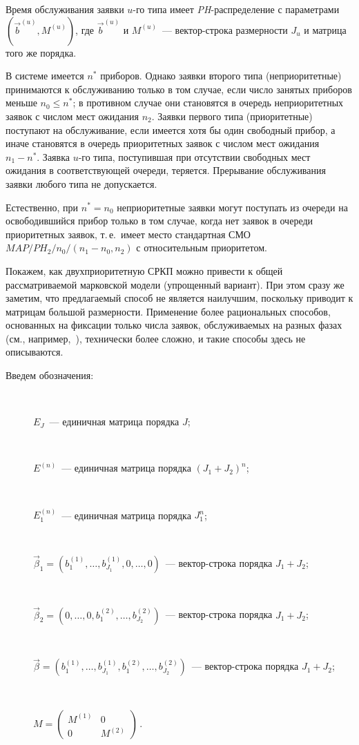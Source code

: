 \begin{multicols}{2}
Время обслуживания заявки $u$-го типа имеет {\it PH}-рас\-пре\-де\-ле\-ние
с параметрами $(\vec b^{(u)},M^{(u)})$, где $\vec b^{(u)}$ и
$M^{(u)}$~--- век\-тор-стро\-ка размерности $J_u$ и мат\-ри\-ца того же порядка.

В системе имеется $n^*$ приборов. Однако заявки второго типа (неприоритетные) принимаются к
обслуживанию только в том случае, если число занятых приборов меньше $n_0\le n^*$;
в противном случае они становятся в очередь неприоритетных заявок с числом мест ожидания $n_2$.
Заявки первого типа (приоритетные) поступают на обслуживание, если имеется
хотя бы один свободный прибор, а иначе становятся в очередь
приоритетных заявок с числом мест ожидания $n_1-n^*$.
Заявка $u$-го типа, поступившая при отсутствии свободных мест
ожидания в соответствующей очереди, теряется.
Прерывание обслуживания заявки любого типа не допускается.

Естественно, при $n^*=n_0$ неприоритетные заявки могут
поступать из очереди на освободившийся прибор только в том
случае, когда нет заявок в очереди приоритетных заявок, т.\,е.\
имеет место стандартная СМО $MAP/PH_2/n_0/(n_1-n_0,n_2)$ с
относительным приоритетом.

Покажем, как двухприоритетную СРКП можно привести к общей
рассматриваемой марковской модели (упрощенный вариант).
При этом сразу же заметим, что предлагаемый способ не
является наилучшим, поскольку приводит к матрицам большой
размерности.
Применение более рациональных способов, основанных на
фиксации только числа заявок, обслуживаемых на разных
фазах (см., например,~\cite{16-p}), технически более сложно, и
такие способы здесь не описываются.

\pagebreak

Введем обозначения:
\begin{description}
\item[\,] $E_J$~--- единичная матрица порядка $J$;
\item[\,] 
$E^{(n)}$~--- единичная матрица порядка $(J_1+J_2)^n$;
\item[\,] 
$E_1^{(n)}$~--- единичная матрица порядка $J_1^n$;
\item[\,] 
$\vec\beta_1 = (b^{(1)}_1,\ldots,b^{(1)}_{J_1},0,\ldots,0)$~---
век\-тор-стро\-ка порядка $J_1+J_2$;
\item[\,] 
$\vec\beta_2=(0,\ldots,0,b^{(2)}_1,\ldots,b^{(2)}_{J_2})$~---
вектор-строка порядка $J_1+J_2$;
\item[\,] 
$\vec\beta=(b^{(1)}_1,\ldots,b^{(1)}_{J_1},
b^{(2)}_1,\ldots,b^{(2)}_{J_2})$~--- век\-тор-стро\-ка порядка $J_1+J_2$;
\item[\,] 
$ M= \begin{pmatrix}
M^{(1)}   &     0       \\
   0      &   M^{(2)}   
   \end{pmatrix}\,.
$
\end{description}


\end{multicols}
